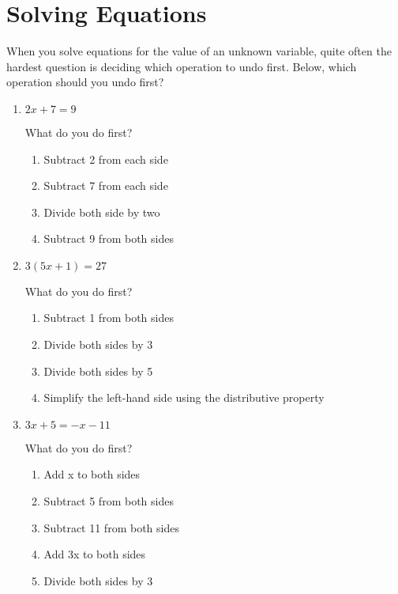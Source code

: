 \documentclass[12pt,letterpaper]{article}
\begin{document}
\section*{Solving Equations}
\begin{large}
{When you solve equations for the value of an unknown variable, quite often the hardest question is deciding which operation to undo first.
Below, which operation should you undo first?}

\begin{enumerate}
\item \quad $2x + 7 = 9$

What do you do first?

	\begin{enumerate}
     	\item{Subtract 2 from each side}
      	\item{Subtract 7 from each side}
      	\item{Divide both side by two}
      	\item{Subtract 9 from both sides}
    \end{enumerate}

\addvspace{0.4in}

\item \quad $3(5x + 1) = 27$

What do you do first?

	\begin{enumerate}
      	\item{Subtract 1 from both sides}
      	\item{Divide both sides by 3}
      	\item{Divide both sides by 5}
     	\item{Simplify the left-hand side using the distributive property}
    \end{enumerate}

\addvspace{0.4in}

\item \quad $3x + 5 = -x - 11$

What do you do first?

	\begin{enumerate}
      	\item{Add x to both sides}
      	\item{Subtract 5 from both sides}
      	\item{Subtract 11 from both sides}
      	\item{Add 3x to both sides}
     	\item{Divide both sides by 3}
    \end{enumerate}

\addvspace{0.4in}

\end{enumerate}
\end{large}
\end{document}
